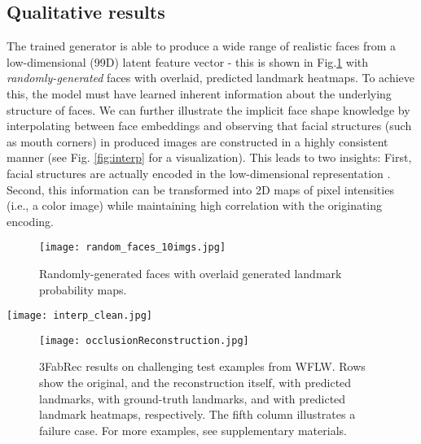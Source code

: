 \documentclass[10pt,twocolumn,letterpaper]{article}
\begin{document}
\subsection{Qualitative results}
The trained generator is able to produce a wide range of realistic faces from a low-dimensional (99D) latent feature vector  - this is shown in Fig.\ref{fig:random} with {\em randomly-generated} faces with overlaid, predicted landmark heatmaps. To achieve this, the model must have learned inherent information about the underlying structure of faces. We can further illustrate the implicit face shape knowledge by interpolating between face embeddings and observing that facial structures (such as mouth corners) in produced images are constructed in a highly consistent manner (see Fig. \ref{fig:interp} for a visualization). This leads to two insights: First, facial structures are actually encoded in the low-dimensional representation . Second, this information can be transformed into 2D maps of pixel intensities (i.e., a color image) while maintaining high correlation with the originating encoding.

\begin{figure}
	\begin{center}
		\texttt{[image: random\_faces\_10imgs.jpg]}
	\end{center}
	\vspace{-0.5cm}
	\caption{\small Randomly-generated faces with overlaid generated landmark probability maps.}
	\label{fig:random}
	\vspace{-0.2cm}
\end{figure}

\begin{figure*}
	\begin{center}
		\texttt{[image: interp\_clean.jpg]}
	\end{center}
	\vspace{-0.5cm}
	\caption{\small Predicted landmarks of generated faces by interpolation between embedded feature vectors.}
	\label{fig:interp}
	\vspace{-0.2cm}
\end{figure*}


\begin{figure}
	\begin{center}
		\texttt{[image: occlusionReconstruction.jpg]}
	\end{center}
	\vspace{-0.5cm}
	\caption{\small 3FabRec results on challenging test examples from WFLW. Rows show the original, and the reconstruction itself, with predicted landmarks, with ground-truth landmarks, and with predicted landmark heatmaps, respectively. The fifth column illustrates a failure case. For more examples, see supplementary materials.}
	\label{fig:recocc}
	\vspace{-0.5cm}
\end{figure}
\end{document}

